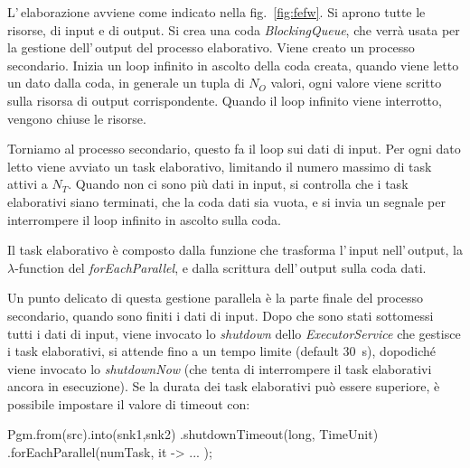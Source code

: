 L'\,ela\-bo\-ra\-zio\-ne avviene come indicato nella fig.~\ref{fig:fefw}.
Si aprono tutte le risorse, di input e di output.
Si crea una coda \textsl{Block\-ing\-Que\-ue}, che verrà usata per la gestione
dell'\,output del processo elaborativo.
Viene creato un processo secondario.
Inizia un loop infinito in ascolto della coda creata,
quando viene letto un dato dalla coda, in generale un tupla di $N_O$ valori,
ogni valore viene scritto sulla risorsa di output corrispondente.
Quando il loop infinito viene interrotto, vengono chiuse le risorse.

Torniamo al processo secondario, questo fa il loop sui dati di input.
Per ogni dato letto viene avviato un task elaborativo,
limitando il numero massimo di task attivi a $N_T$.
Quando non ci sono più dati in input, si controlla che i task elaborativi
siano terminati, che la coda dati sia vuota, e si invia un segnale per
interrompere il loop infinito in ascolto sulla coda.

Il task elaborativo è composto dalla funzione che trasforma l'\,input
nell'\,output, la $\lambda$-function del \textsl{forEachParallel}, e
dalla scrittura dell'\,output sulla coda dati.

Un punto delicato di questa gestione parallela è la parte finale del processo
secondario, quando sono finiti i dati di input.
Dopo che sono stati sottomessi tutti i dati di input, viene invocato lo
\textsl{shutdown} dello \textsl{ExecutorService} che gestisce i task
elaborativi, si attende fino a un tempo limite (default 30~s), dopodiché
viene invocato lo \textsl{shutdownNow} (che tenta di interrompere il task
elaborativi ancora in esecuzione).
Se la durata dei task elaborativi può essere superiore, è possibile impostare
il valore di timeout con:
\begin{elisting}[!htb]
    \begin{javacode}
        Pgm.from(src).into(snk1,snk2)
            .shutdownTimeout(long, TimeUnit)
            .forEachParallel(numTask, it -> { ... });
    \end{javacode}
    \caption{elaborazione $1\mapsto N$ (FEFW), con shutdown timeout}
    \label{lst:processTupleFEFW-tmo}
\end{elisting}

